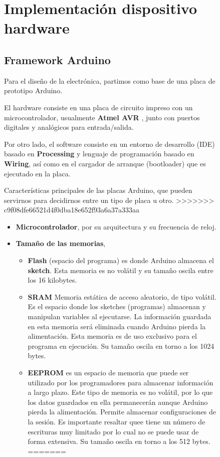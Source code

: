 \begin{figure}[h]
\begin{itemize}
\end{itemize}




\section{Implementación dispositivo hardware}

\subsection{Framework Arduino}
Para el diseño de la electrónica, partimos como base de una placa de prototipo Arduino.

\bigskip
El hardware consiste en una placa de circuito impreso con un microcontrolador, usualmente \textbf{Atmel AVR} \cite{Atmel}, junto con  puertos digitales y analógicos para entrada/salida.

\bigskip
Por otro lado, el software consiste en un entorno de desarrollo (IDE) basado en \textbf{Processing} \cite{Process}  y lenguaje de programación basado en \textbf{Wiring}, así como en el cargador de arranque (bootloader) que es ejecutado en la placa.

Características principales de las placas Arduino, que pueden servirnos para decidirnos entre un tipo de placa u otro.
>>>>>>> c9f08dfe66521d4f0dba18e652f93a6a37a333aa

\begin{itemize}
	\item \textbf{Microcontrolador}, por su arquitectura y su frecuencia de reloj.
	\item \textbf {Tamaño de las memorias},
	\begin{itemize}
<<<<<<< HEAD
		\item{\textbf{Flash}} (espacio del programa) es donde Arduino almacena el \textbf{sketch}. Esta memoria es no volátil y su tamaño oscila entre los 16 kilobytes.
		
		\item{\textbf{SRAM}} Memoria estática de acceso aleatorio, de tipo volátil. Es el espacio donde los sketches (programas) almacenan y manipulan variables al ejecutarse. La información guardada en esta memoria será eliminada cuando Arduino pierda la alimentación. Esta memoria es de uso exclusivo para el programa en ejecución. Su tamaño oscila en torno a los 1024 bytes.
		
		\item{\textbf{EEPROM}} es un espacio de memoria que puede ser utilizado por los programadores para almacenar información a largo plazo. Este tipo de memoria es no volátil, por lo que los datos guardados en ella permanecerán aunque Arduino pierda la alimentación. Permite almacenar configuraciones de la sesión. Es importante resaltar quee tiene un número de escrituras muy limitado por lo cual no se puede usar de forma extensiva. Su tamaño oscila en torno a los 512 bytes.
=======
		

\end{itemize}
\end{itemize}
\end{figure}
